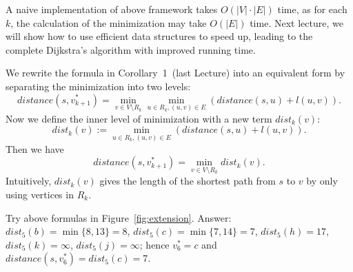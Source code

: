 \begin{minipage}{0.8\textwidth}
	\xxx
	\xxx
	\xxx
	\xxx
	\xxx
	\xxx
	\xxx
	\xxx
	\xxx
\end{minipage}

A naive implementation of above framework takes $O(|V|\cdot|E|)$ time,
as for each $k$, the calculation of the minimization may take $O(|E|)$ time.
Next lecture, we will show how to use efficient data structures to speed up,
leading to the complete Dijkstra's algorithm with improved running time.

We rewrite the formula in Corollary~1~(last Lecture) into an equivalent form by separating the minimization into two levels:
$$distance(s, v_{k+1}^*) = \textstyle \min_{v\in V\setminus R_k} \min_{u\in R_k, (u, v)\in E} (distance(s, u) + l(u,v)).$$
Now we define the inner level of minimization with a new term $dist_k(v)$:
$$dist_k(v) := \textstyle \min_{u\in R_k, (u, v)\in E} (distance(s, u) + l(u,v)).$$
Then we have 
$$distance(s, v_{k+1}^*) = \textstyle \min_{v\in V\setminus R_k} dist_k(v).$$
Intuitively, $dist_k(v)$ gives the length of the shortest path from $s$ to $v$ by only using vertices in $R_k$.

Try above formulas in Figure~\ref{fig:extension}.
Answer: $dist_5(b) = \min\{8, 13\} = 8$, $dist_5(c) = \min\{7, 14\} = 7$, $dist_5(h) = 17$, $dist_5(k) = \infty$, $dist_5(j) = \infty$;
hence $v_6^* = c$ and $distance(s,v_6^*) = dist_5(c) = 7$.


